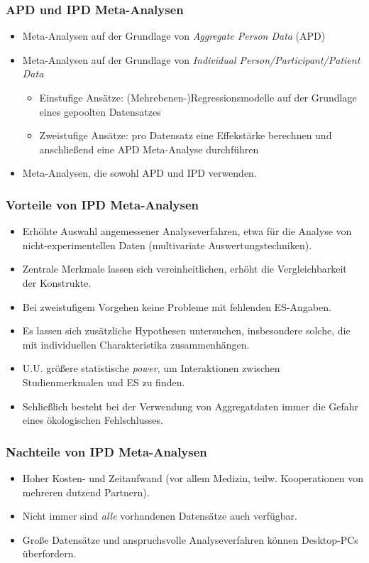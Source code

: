 \begin{frame}\frametitle{APD und IPD Meta-Analysen}
  \begin{itemize}
  \item Meta-Analysen auf der Grundlage von \emph{Aggregate Person Data} (APD)
  \item Meta-Analysen auf der Grundlage von \emph{Individual Person/Participant/Patient Data}
    \begin{itemize}
    \item Einstufige Ansätze: (Mehrebenen-)Regressionsmodelle auf der Grundlage eines gepoolten Datensatzes
    \item Zweistufige Ansätze: pro Datensatz eine Effekstärke berechnen und anschließend eine APD Meta-Analyse durchführen
    \end{itemize}
  \item Meta-Analysen, die sowohl APD und IPD verwenden.
  \end{itemize}
\end{frame}



\begin{frame}\frametitle{Vorteile von IPD Meta-Analysen}
  \begin{footnotesize}
    \begin{itemize}
    \item Erhöhte Auswahl angemessener Analyseverfahren, etwa für die Analyse
      von nicht-experimentellen Daten (multivariate Auswertungstechniken).
    \item Zentrale Merkmale lassen sich vereinheitlichen, erhöht die
      Vergleichbarkeit der Konstrukte.
    \item Bei zweistufigem Vorgehen keine Probleme mit fehlenden ES-Angaben.
    \item Es lassen sich zusätzliche Hypothesen untersuchen, insbesondere
      solche, die mit individuellen Charakteristika zusammenhängen.
    \item U.U. größere statistische \emph{power}, um Interaktionen zwischen
      Studienmerkmalen und ES zu finden.
    \item Schließlich besteht bei der Verwendung von Aggregatdaten immer die
      Gefahr eines ökologischen Fehlschlusses.
    \end{itemize}
    \citep[Quelle: ][252]{weis_potentiale_2008, pigott_advances_2012}
  \end{footnotesize}
\end{frame}


\begin{frame}\frametitle{Nachteile von IPD Meta-Analysen}
  \begin{itemize}
  \item Hoher Kosten- und Zeitaufwand (vor allem Medizin, teilw. Kooperationen von mehreren dutzend Partnern).
  \item Nicht immer sind \emph{alle} vorhandenen Datensätze auch verfügbar.
  \item Große Datensätze und anspruchsvolle Analyseverfahren können Desktop-PCs überfordern.
  \end{itemize}
\end{frame}


